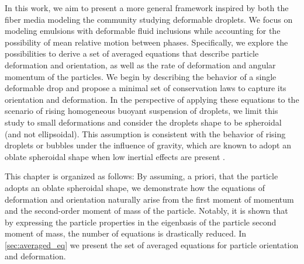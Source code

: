 In this work, we aim to present a more general framework inspired by both the fiber media modeling the community studying deformable droplets. 
We focus on modeling emulsions with deformable fluid inclusions while accounting for the possibility of mean relative motion between phases. 
Specifically, we explore the possibilities to derive a set of averaged equations that describe particle deformation and orientation, as well as the rate of deformation and angular momentum of the particles.
We begin by describing the behavior of a single deformable drop and propose a minimal set of conservation laws to capture its orientation and deformation. 
In the perspective of applying these equations to the scenario of rising homogeneous buoyant suspension of droplets,  we limit this study to small deformations and consider the droplets shape to be spheroidal (and not ellipsoidal). 
This assumption is consistent with the behavior of rising droplets or bubbles under the influence of gravity, which are known to adopt an oblate spheroidal shape when low inertial effects are present \citep{taylor1964deformation}. 


This chapter is organized as follows:
By assuming, a priori, that the particle adopts an oblate spheroidal shape, we demonstrate how the equations of deformation and orientation naturally arise from the first moment of momentum and the second-order moment of mass of the particle.
Notably, it is shown that by expressing the particle properties in the eigenbasis of the particle second moment of mass, the number of equations is drastically reduced.
In \ref{sec:averaged_eq} we present the set of averaged equations for particle orientation and deformation. 

